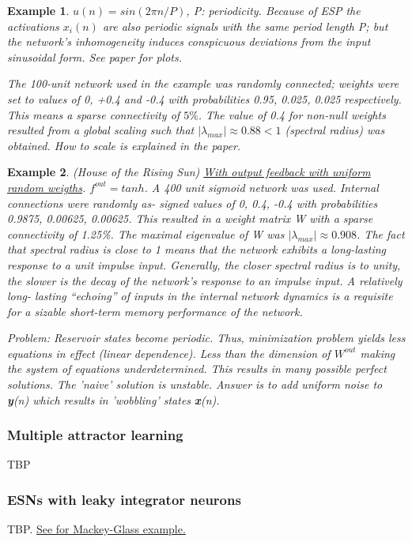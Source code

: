 \documentclass{article}
\newtheorem{example}{Example}
\begin{document}
\begin{example}
$u(n) = sin(2\pi n/P)$, P: periodicity. Because of ESP the activations $x_i(n)$ are also periodic signals with the same period length P; but the network’s inhomogeneity induces conspicuous deviations from the input sinusoidal form. See paper for plots.

The 100-unit network used in the example was randomly connected; weights were set to values of 0, +0.4 and -0.4 with probabilities 0.95, 0.025, 0.025 respectively. This means a sparse connectivity of $5\%$. The value of 0.4 for non-null weights resulted from a global scaling such that $| \lambda_{max} | \approx 0.88 < 1$ (spectral radius) was obtained. How to scale is explained in the paper.
\end{example}

\begin{example}
(House of the Rising Sun) \underline{With output feedback with uniform random weigths}. $f^{out} = tanh$. A 400 unit sigmoid network was used. Internal connections were randomly as- signed values of 0, 0.4, -0.4 with probabilities 0.9875, 0.00625, 0.00625. This resulted in a weight matrix W with a sparse connectivity of 1.25\%. The maximal eigenvalue of W was $| \lambda_{max}| \approx 0.908$. The fact that spectral radius is close to 1 means that the network exhibits a long-lasting response to a unit impulse input. Generally, the closer spectral radius is to unity, the slower is the decay of the network’s response to an impulse input. A relatively long- lasting “echoing” of inputs in the internal network dynamics is a requisite for a sizable short-term memory performance of the network.

Problem: Reservoir states become periodic. Thus, minimization problem yields less equations in effect (linear dependence). Less than the dimension of $W^{out}$ making the system of equations underdetermined. This results in many possible perfect solutions. The 'naive' solution is unstable. Answer is to add uniform noise to \textbf y(n) which results in 'wobbling' states \textbf x(n).
\end{example}

\subsubsection{Multiple attractor learning}
TBP
\subsubsection{ESNs with leaky integrator neurons}
TBP. \href{https://quantumyilmaz.github.io/MTFS21/Examples/SimpleESN/large/SimpleESN_large.html}{\color{blue}See for Mackey-Glass example.}
\end{document}
